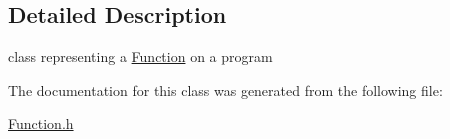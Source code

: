 \subsection{\-Detailed \-Description}
class representing a \hyperlink{classFunction}{\-Function} on a program 

\-The documentation for this class was generated from the following file\-:\begin{DoxyCompactItemize}
\item 
\hyperlink{Function_8h}{\-Function.\-h}\end{DoxyCompactItemize}
